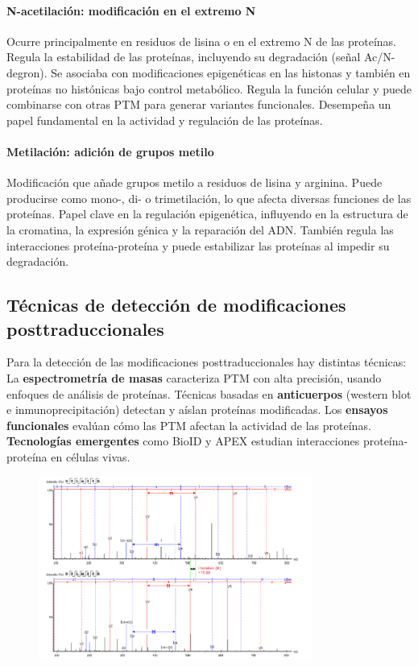 \paragraph{N-acetilación: modificación en el extremo N}
Ocurre principalmente en residuos de lisina o en el extremo N de las proteínas. Regula la estabilidad de las proteínas, incluyendo su degradación (señal Ac/N-degron). Se asociaba con modificaciones epigenéticas en las histonas y también en proteínas no histónicas bajo control metabólico. Regula la función celular y puede combinarse con otras PTM para generar variantes funcionales. Desempeña un papel fundamental en la actividad y regulación de las proteínas.

\paragraph{Metilación: adición de grupos metilo}
Modificación que añade grupos metilo a residuos de lisina y arginina. Puede producirse como mono-, di- o trimetilación, lo que afecta diversas funciones de las proteínas. Papel clave en la regulación epigenética, influyendo en la estructura de la cromatina, la expresión génica y la reparación del ADN. También regula las interacciones proteína-proteína y puede estabilizar las proteínas al impedir su degradación.

\subsection{Técnicas de detección de modificaciones posttraduccionales}
Para la detección de las modificaciones posttraduccionales hay distintas técnicas: La \textbf{espectrometría de masas} caracteriza PTM con alta precisión, usando enfoques de análisis de proteínas. Técnicas basadas en \textbf{anticuerpos} (western blot e inmunoprecipitación) detectan y aíslan proteínas modificadas. Los \textbf{ensayos funcionales} evalúan cómo las PTM afectan la actividad de las proteínas. \textbf{Tecnologías emergentes} como BioID y APEX estudian interacciones proteína-proteína en células vivas.

\begin{figure}[h]
\centering
\includegraphics[width = 0.8\textwidth]{figs/ms-ptm.png}
\end{figure}

